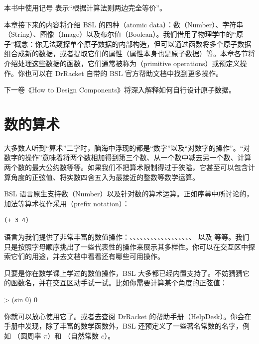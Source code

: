 \begin{notebox}[关于等号符号]
本书中使用记号 \code{==} 表示“根据计算法则两边完全等价”。
\end{notebox}

本章接下来的内容将介绍 BSL 的四种（atomic data）：数（Number）、字符串（String）、图像（Image）以及布尔值（Boolean）。我们借用了物理学中的“原子”概念：你无法窥探单个原子数据的内部构造，但可以通过函数将多个原子数据组合成新的数据，或者提取它们的属性（属性本身也是原子数据）等。本章各节将介绍处理这些数据的函数，它们通常被称为（primitive operations）或预定义操作。你也可以在 DrRacket 自带的 BSL 官方帮助文档中找到更多操作。

\begin{notebox}[进阶提示]
下一卷《How to Design Components》将深入解释如何自行设计原子数据。
\end{notebox}


\section{数的算术}
\label{sec:1.1}

大多数人听到“算术”二字时，脑海中浮现的都是“数字”以及“对数字的操作”。“对数字的操作”意味着将两个数相加得到第三个数、从一个数中减去另一个数、计算两个数的最大公约数等等。如果我们不把算术限制得过于狭隘，它甚至可以包含计算角度的正弦值、将实数四舍五入为最接近的整数等数学运算。

BSL 语言原生支持数（Number）以及针对数的算术运算。正如序幕中所讨论的，加法等算术操作采用（prefix notation）：
\begin{lstlisting}[language=BSL]
(+ 3 4)
\end{lstlisting}

语言为我们提供了非常丰富的数值操作：\code{+}、\code{-}、\code{*}、\code{/}、、、、、、、、、、、、、、、 以及  等等。我们只是按照字母顺序挑出了一些代表性的操作来展示其多样性。你可以在交互区中探索它们的用途，并去文档中看看还有哪些可用操作。

只要是你在数学课上学过的数值操作，BSL 大多都已经内置支持了。不妨猜猜它的函数名，并在交互区动手试一试。比如你需要计算某个角度的正弦值：
\begin{replbox}
> (sin 0)
0
\end{replbox}
你就可以放心使用它了。或者去查阅 DrRacket 的帮助手册（HelpDesk）。你会在手册中发现，除了丰富的数学函数外，BSL 还预定义了一些著名常数的名字，例如 （圆周率 $\pi$）和 （自然常数 $e$）。

